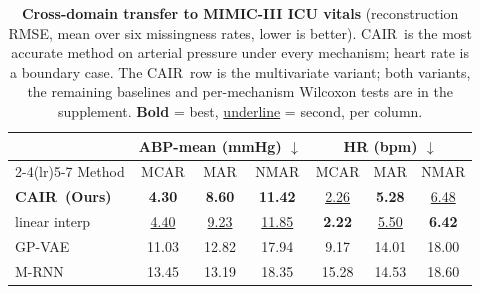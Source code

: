 \begin{table}[t]
  \centering
  {\small
  \setlength{\tabcolsep}{1mm}
  \begin{tabular}{lcccccc}
    \toprule
    & \multicolumn{3}{c}{ABP-mean (mmHg) $\downarrow$} & \multicolumn{3}{c}{HR (bpm) $\downarrow$} \\
    \cmidrule(lr){2-4}\cmidrule(lr){5-7}
    Method & MCAR & MAR & NMAR & MCAR & MAR & NMAR \\
    \midrule
    \textbf{CAIR\ (Ours)} & \textbf{4.30} & \textbf{8.60} & \textbf{11.42} & \underline{2.26} & \textbf{5.28} & \underline{6.48} \\
    linear interp & \underline{4.40} & \underline{9.23} & \underline{11.85} & \textbf{2.22} & \underline{5.50} & \textbf{6.42} \\
    GP-VAE & 11.03 & 12.82 & 17.94 & 9.17 & 14.01 & 18.00 \\
    M-RNN & 13.45 & 13.19 & 18.35 & 15.28 & 14.53 & 18.60 \\
    \bottomrule
  \end{tabular}}
  \caption{\textbf{Cross-domain transfer to MIMIC-III ICU vitals}
  (reconstruction RMSE, mean over six missingness rates, lower is better).
  CAIR\ is the most accurate method on arterial pressure under every mechanism;
  heart rate is a boundary case. The CAIR\ row is the multivariate variant;
  both variants, the remaining baselines and per-mechanism Wilcoxon tests are
  in the supplement.
  \textbf{Bold} = best, \underline{underline} = second, per column.}
  \label{tab:mimic}
\end{table}

